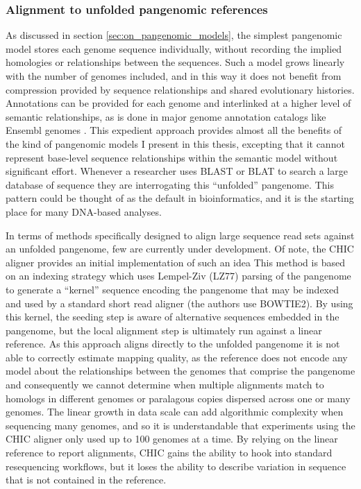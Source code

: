 \subsubsection{Alignment to unfolded pangenomic references}

As discussed in section \ref{sec:on_pangenomic_models}, the simplest pangenomic model stores each genome sequence individually, without recording the implied homologies or relationships between the sequences.
Such a model grows linearly with the number of genomes included, and in this way it does not benefit from compression provided by sequence relationships and shared evolutionary histories.
Annotations can be provided for each genome and interlinked at a higher level of semantic relationships, as is done in major genome annotation catalogs like Ensembl genomes \cite{kersey2015ensembl}.
This expedient approach provides almost all the benefits of the kind of pangenomic models I present in this thesis, excepting that it cannot represent base-level sequence relationships within the semantic model without significant effort.
Whenever a researcher uses BLAST or BLAT to search a large database of sequence they are interrogating this ``unfolded'' pangenome.
This pattern could be thought of as the default in bioinformatics, and it is the starting place for many DNA-based analyses.

In terms of methods specifically designed to align large sequence read sets against an unfolded pangenome, few are currently under development.
Of note, the CHIC aligner provides an initial implementation of such an idea \cite{valenzuela2017chic}
This method is based on an indexing strategy which uses Lempel-Ziv (LZ77) \cite{ziv1977universal} parsing of the pangenome to generate a ``kernel'' sequence encoding the pangenome that may be indexed and used by a standard short read aligner (the authors use BOWTIE2).
By using this kernel, the seeding step is aware of alternative sequences embedded in the pangenome, but the local alignment step is ultimately run against a linear reference.
As this approach aligns directly to the unfolded pangenome it is not able to correctly estimate mapping quality, as the reference does not encode any model about the relationships between the genomes that comprise the pangenome and consequently we cannot determine when multiple alignments match to homologs in different genomes or paralagous copies dispersed across one or many genomes.
The linear growth in data scale can add algorithmic complexity when sequencing many genomes, and so it is understandable that experiments using the CHIC aligner only used up to 100 genomes at a time.
By relying on the linear reference to report alignments, CHIC gains the ability to hook into standard resequencing workflows, but it loses the ability to describe variation in sequence that is not contained in the reference.

